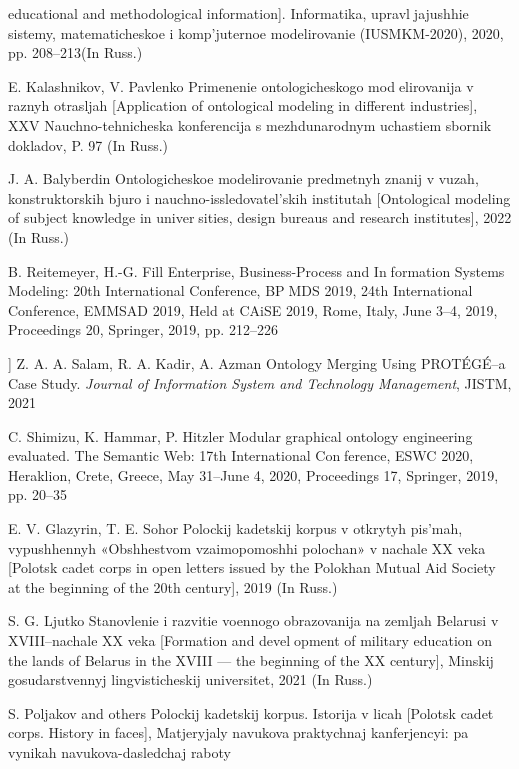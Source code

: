 \documentclass{article}
\begin{document}
\begin{multicols}{2}
{\begin{enumerate}[label={[}\footnotesize\arabic*{]}, noitemsep]
educational and methodological information]. Informatika, upravljajushhie sistemy, matematicheskoe i komp’juternoe modelirovanie
(IUSMKM-2020), 2020, pp. 208–213(In Russ.)
\end{enumerate}
\columnbreak
\begin{enumerate}[label={[}\footnotesize\arabic*{]}, noitemsep, resume]
\item E. Kalashnikov, V. Pavlenko Primenenie ontologicheskogo modelirovanija v raznyh otrasljah [Application of ontological modeling
in different industries], XXV Nauchno-tehnicheska konferencija s
mezhdunarodnym uchastiem sbornik dokladov, P. 97 (In Russ.)
\item J. A. Balyberdin Ontologicheskoe modelirovanie predmetnyh
znanij v vuzah, konstruktorskih bjuro i nauchno-issledovatel’skih
institutah [Ontological modeling of subject knowledge in universities, design bureaus and research institutes], 2022 (In Russ.)
\item B. Reitemeyer, H.-G. Fill Enterprise, Business-Process and Information Systems Modeling: 20th International Conference, BPMDS 2019, 24th International Conference, EMMSAD 2019, Held
at CAiSE 2019, Rome, Italy, June 3–4, 2019, Proceedings 20,
Springer, 2019, pp. 212–226
\item ] Z. A. A. Salam, R. A. Kadir, A. Azman Ontology Merging
Using PROTÉGÉ–a Case Study. \textit{Journal of Information System
and Technology Management}, JISTM, 2021
\item  C. Shimizu, K. Hammar, P. Hitzler Modular graphical ontology
engineering evaluated. The Semantic Web: 17th International Conference, ESWC 2020, Heraklion, Crete, Greece, May 31–June 4,
2020, Proceedings 17, Springer, 2019, pp. 20–35
\item E. V. Glazyrin, T. E. Sohor Polockij kadetskij korpus v
otkrytyh pis’mah, vypushhennyh «Obshhestvom vzaimopomoshhi
polochan» v nachale XX veka [Polotsk cadet corps in open letters
issued by the Polokhan Mutual Aid Society at the beginning of
the 20th century], 2019 (In Russ.)
\item  S. G. Ljutko Stanovlenie i razvitie voennogo obrazovanija na
zemljah Belarusi v XVIII–nachale XX veka [Formation and development of military education on the lands of Belarus in the XVIII
— the beginning of the XX century], Minskij gosudarstvennyj
lingvisticheskij universitet, 2021 (In Russ.)
\item  S. Poljakov and others Polockij kadetskij korpus. Istorija v licah
[Polotsk cadet corps. History in faces], Matjeryjaly navukovapraktychnaj kanferjencyi: pa vynikah navukova-dasledchaj raboty

\end{enumerate}}
\end{multicols}
\end{document}
